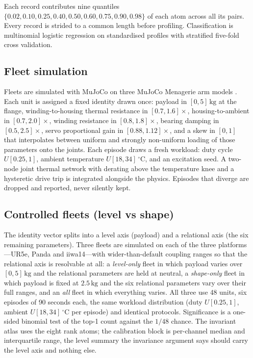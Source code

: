 \documentclass[11pt]{article}
\begin{document}
Each record contributes nine quantiles $\{0.02, 0.10, 0.25, 0.40, 0.50, 0.60,
0.75, 0.90, 0.98\}$ of each atom across all its pairs. Every record is strided
to a common length before profiling. Classification is multinomial logistic
regression \cite{cox1958} on standardised profiles with stratified five-fold
cross validation.

\subsection{Fleet simulation}

Fleets are simulated with MuJoCo \cite{todorov2012} on three MuJoCo Menagerie
arm models \cite{guo2022}. Each unit is assigned a fixed identity drawn once:
payload in $[0, 5]\,\mathrm{kg}$ at the flange, winding-to-housing thermal
resistance in $[0.7, 1.6]\times$, housing-to-ambient in $[0.7, 2.0]\times$,
winding resistance in $[0.8, 1.8]\times$, bearing damping in $[0.5, 2.5]\times$,
servo proportional gain in $[0.88, 1.12]\times$, and a skew in $[0, 1]$ that
interpolates between uniform and strongly non-uniform loading of those
parameters onto the joints. Each episode draws a fresh workload: duty cycle
$U[0.25, 1]$, ambient temperature $U[18, 34]\,{}^\circ\mathrm{C}$, and an
excitation seed. A two-node joint thermal network with derating above the
temperature knee and a hysteretic drive trip is integrated alongside the
physics. Episodes that diverge are dropped and reported, never silently kept.

\subsection{Controlled fleets (level vs shape)}

The identity vector splits into a level axis (payload) and a relational axis
(the six remaining parameters). Three fleets are simulated on each of the
three platforms---UR5e, Panda and iiwa14---with wider-than-default coupling
ranges so that the relational axis is resolvable at all: a \emph{level-only}
fleet in which payload varies over $[0,5]\,\mathrm{kg}$ and the relational
parameters are held at neutral, a \emph{shape-only} fleet in which payload is
fixed at $2.5\,\mathrm{kg}$ and the six relational parameters vary over their
full ranges, and an \emph{all} fleet in which everything varies. All three
use 48 units, six episodes of 90 seconds each, the same workload
distribution (duty $U[0.25,1]$, ambient $U[18,34]\,{}^\circ\mathrm{C}$
per episode) and identical protocols. Significance is a one-sided binomial
test of the top-1 count against the $1/48$ chance. The invariant atlas uses
the eight rank atoms; the calibration block is per-channel median and
interquartile range, the level summary the invariance argument says should
carry the level axis and nothing else.
\end{document}
